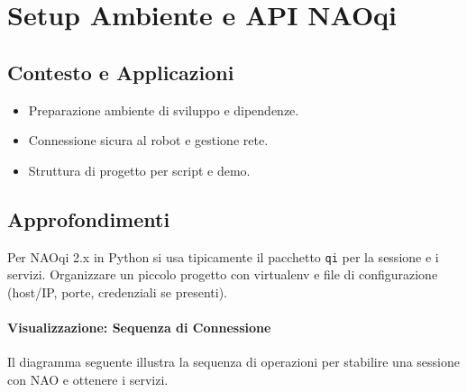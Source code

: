 \chapter{Setup Ambiente e API NAOqi}

\section{Contesto e Applicazioni}
\begin{tcolorbox}[title=Contesto e Applicazioni]
\begin{itemize}
  \item Preparazione ambiente di sviluppo e dipendenze.
  \item Connessione sicura al robot e gestione rete.
  \item Struttura di progetto per script e demo.
\end{itemize}
\end{tcolorbox}

\section{Approfondimenti}
Per NAOqi 2.x in Python si usa tipicamente il pacchetto \texttt{qi} per la sessione e i servizi. Organizzare un piccolo progetto con virtualenv e file di configurazione (host/IP, porte, credenziali se presenti).

\subsubsection{Visualizzazione: Sequenza di Connessione}
Il diagramma seguente illustra la sequenza di operazioni per stabilire una sessione con NAO e ottenere i servizi.

